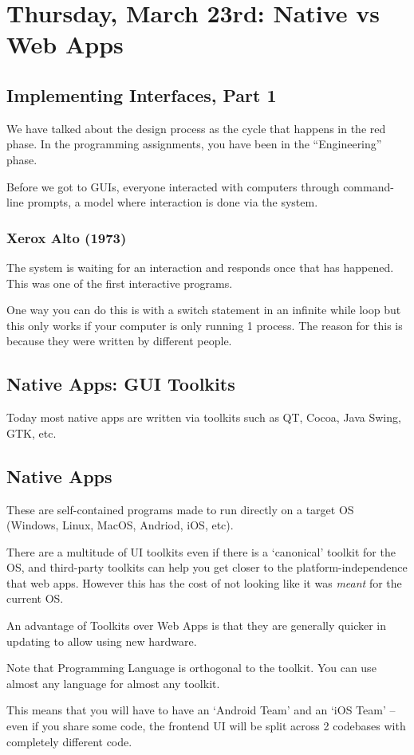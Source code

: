 \section{Thursday, March 23rd: Native vs Web Apps}
\subsection{Implementing Interfaces, Part 1}
We have talked about the design process as the cycle that happens in the red phase. In the programming assignments, you have been in the ``Engineering'' phase.

Before we got to GUIs, everyone interacted with computers through command-line prompts, a model where interaction is done via the system.

\subsubsection{Xerox Alto (1973)}
The system is waiting for an interaction and responds once that has happened. This was one of the first interactive programs.

One way you can do this is with a switch statement in an infinite while loop but this only works if your computer is only running 1 process. The reason for this is because they were written by different people.

\subsection{Native Apps: GUI Toolkits}
Today most native apps are written via toolkits such as QT, Cocoa, Java Swing, GTK, etc.

\subsection{Native Apps}
These are self-contained programs made to run directly on a target OS (Windows, Linux, MacOS, Andriod, iOS, etc).

There are a multitude of UI toolkits even if there is a `canonical' toolkit for the OS, and third-party toolkits can help you get closer to the platform-independence that web apps. However this has the cost of not looking like it was \textit{meant} for the current OS.

An advantage of Toolkits over Web Apps is that they are generally quicker in updating to allow using new hardware.

Note that Programming Language is orthogonal to the toolkit. You can use almost any language for almost any toolkit.
\begin{important}
This means that you will have to have an `Android Team' and an `iOS Team' -- even if you share some code, the frontend UI will be split across 2 codebases with completely different code.
\end{important}

